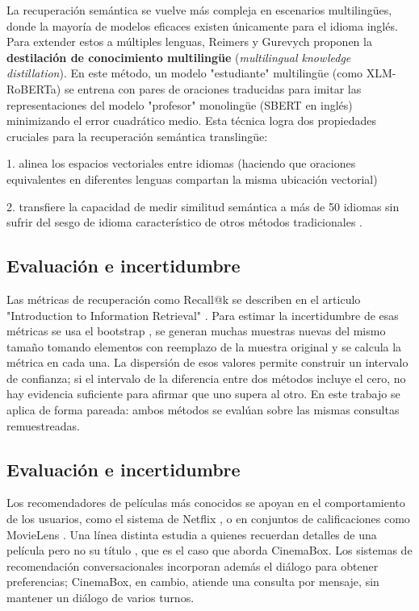 La recuperación semántica se vuelve más compleja en escenarios multilingües, donde la mayoría de modelos eficaces existen únicamente para el idioma inglés. Para extender estos \textitembeddings a múltiples lenguas, Reimers y Gurevych \cite{reimers2020multilingual} proponen la \textbf{destilación de conocimiento multilingüe} (\textit{multilingual knowledge distillation}). En este método, un modelo "estudiante" multilingüe (como XLM-RoBERTa) se entrena con pares de oraciones traducidas para imitar las representaciones del modelo "profesor" monolingüe (SBERT en inglés) minimizando el error cuadrático medio. Esta técnica logra dos propiedades cruciales para la recuperación semántica translingüe: 

1. alinea los espacios vectoriales entre idiomas (haciendo que oraciones equivalentes en diferentes lenguas compartan la misma ubicación vectorial)

2. transfiere la capacidad de medir similitud semántica a más de 50 idiomas sin sufrir del sesgo de idioma característico de otros métodos tradicionales \cite{reimers2020multilingual}.

\subsection{Evaluación e incertidumbre}
Las métricas de recuperación como Recall@k se describen en el articulo "Introduction to Information Retrieval" \cite{manning2008ir}. Para estimar la incertidumbre de esas métricas se usa el bootstrap \cite{efron1979bootstrap,efron1993bootstrap}, se generan muchas muestras nuevas del mismo tamaño tomando elementos con reemplazo de la muestra original y se calcula la métrica en cada una. La dispersión de esos valores permite construir un intervalo de confianza; si el intervalo de la diferencia entre dos métodos incluye el cero, no hay evidencia suficiente para afirmar que uno supera al otro. En este trabajo se aplica de forma pareada: ambos métodos se evalúan sobre las mismas consultas remuestreadas.

\subsection{Evaluación e incertidumbre}
Los recomendadores de películas más conocidos se apoyan en el comportamiento de los usuarios, como el sistema de Netflix \cite{gomezuribe2015netflix}, o en conjuntos de calificaciones como MovieLens \cite{harper2015movielens}. Una línea distinta estudia a quienes recuerdan detalles de una película pero no su título \cite{arguello2021tot}, que es el caso que aborda CinemaBox. Los sistemas de recomendación conversacionales \cite{jannach2021crs} incorporan además el diálogo para obtener preferencias; CinemaBox, en cambio, atiende una consulta por mensaje, sin mantener un diálogo de varios turnos.

